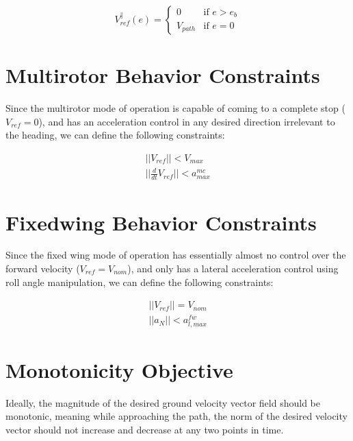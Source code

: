 \begin{equation}
    V_{ref}^{\parallel}(e)=\begin{cases}
    0& \text{if $e > e_b$}\\
    V_{path}& \text{if $e = 0$}
\end{cases}
\label{eq:v_parallel_constraints}
\end{equation}

\section{Multirotor Behavior Constraints}

Since the multirotor mode of operation is capable of coming to a complete stop ($V_{ref} = 0$), and has an acceleration control in any desired direction irrelevant to the heading, we can define the following constraints:

\begin{equation}
\begin{split}
    ||V_{ref}|| < V_{max}\\
    ||\frac{d}{dt}V_{ref}|| < a_{max}^{mc}
\end{split}
\label{eq:multirotor_problem_definition}
\end{equation}

\section{Fixedwing Behavior Constraints}
Since the fixed wing mode of operation has essentially almost no control over the forward velocity ($V_{ref} = V_{nom}$), and only has a lateral acceleration control using roll angle manipulation, we can define the following constraints:

\begin{equation}
\begin{split}
    ||V_{ref}|| = V_{nom}\\
    ||a_{N}|| < a_{l, max}^{fw}
\end{split}
\label{eq:fixedwing_problem_definition}
\end{equation}

\section{Monotonicity Objective}
Ideally, the magnitude of the desired ground velocity vector field should be monotonic, meaning while approaching the path, the norm of the desired velocity vector should not increase and decrease at any two points in time.\\

